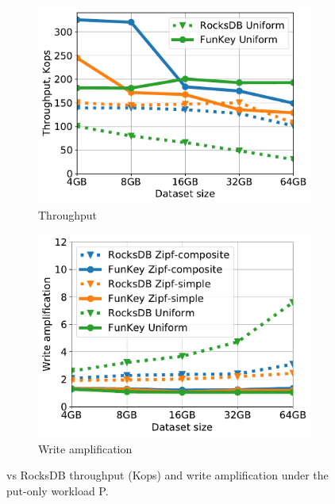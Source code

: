 \begin{figure}[tb]
\centering
\begin{subfigure}{0.49\columnwidth}\centering
\includegraphics[width=\textwidth]{figs/Workload_P_line.pdf}
\caption{Throughput}
\label{fig:throughput:p}
\end{subfigure}
\begin{subfigure}{0.49\columnwidth}\centering
\includegraphics[width=\textwidth]{figs/write_amp_p_line.pdf}
\caption{Write amplification }
\label{fig:writeamp}
\end{subfigure}
\caption{
{\sys\/ vs RocksDB throughput (Kops) and write amplification under the put-only workload P.}
}
\label{fig:putonly}
\end{figure}

